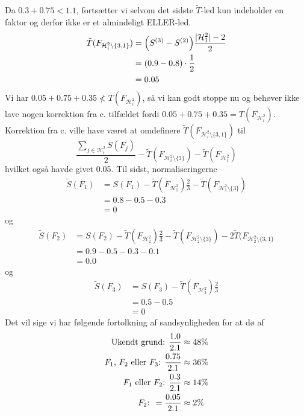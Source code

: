 \documentclass[a4paper, 12pt]{memoir}
\begin{document}
Da $0.3+0.75<1.1$, fortsætter vi selvom det sidste \( \tilde T \)-led kun indeholder en faktor og derfor ikke er et almindeligt ELLER-led. 
\begin{align*}
\tilde T(F_{\mathcal H_i^2\setminus\{3,1\}})&=\Bigl(S^{(3)}-S^{(2)}\Bigr)\frac{|\mathcal H_1^2|-2}{2}\\
&=(0.9-0.8)\cdot \frac{1}{2}\\
&=0.05
\end{align*}
Vi har $0.05+0.75+0.35\not<T(F_{\mathcal H_i^2})$, så vi kan godt stoppe nu og behøver ikke lave nogen korrektion fra c. tilfældet fordi $0.05+0.75+0.35=T(F_{\mathcal H_i^2})$. Korrektion fra c. ville have været at omdefinere $\tilde T(F_{\mathcal H_i^2\setminus\{3,1\}})$ til 
\begin{equation*}
\frac{\sum_{j\in \mathcal H_i^2}S(F_j)}{2}-\tilde T(F_{\mathcal H_i^2\setminus\{3\}})-\tilde T(F_{\mathcal H_i^2})
\end{equation*}
hvilket også havde givet 0.05. Til sidst, normaliseringerne
\begin{align*}
\tilde S(F_1)&=S(F_1)-\tilde T(F_{\mathcal H_1^2})\frac{2}{3}- \tilde T(F_{\mathcal H_1^2\setminus\{3\}})\\
&=0.8-0.5-0.3\\
&=0
\end{align*}
og 
\begin{align*}
\tilde S(F_2)&=S(F_2)-\tilde T(F_{\mathcal H_2^2})\frac{2}{3}- \tilde T(F_{\mathcal H_2^2\setminus\{3\}})-2\tilde T(F_{\mathcal H_2^2\setminus\{3,1\}}\\
&=0.9-0.5-0.3-0.1\\
&=0.0
\end{align*}
og
\begin{align*}
\tilde S(F_3)&=S(F_3)-\tilde T(F_{\mathcal H_2^2})\frac{2}{3}\\
&=0.5-0.5\\
&=0
\end{align*}
Det vil sige vi har følgende fortolkning af sandsynligheden for at dø af 
\begin{align}
\textup{Ukendt grund: } \frac{1.0}{2.1}&\approx 48 \%\\
\textup{$F_1$, $F_2$ eller $F_3$: } \frac{0.75}{2.1}&\approx 36 \%\\
\textup{$F_1$ eller $F_2$: } \frac{0.3}{2.1}&\approx 14 \%\\
\textup{$F_2$: }=\frac{0.05}{2.1}&\approx 2 \%
\end{align}
\end{document}
